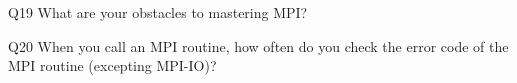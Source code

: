 \begin{description}%
\item{Q19} What are your obstacles to mastering MPI?%
\item{Q20} When you call an MPI routine, how often do you check the error code of the MPI routine  (excepting MPI-IO)?%
\end{description}%
